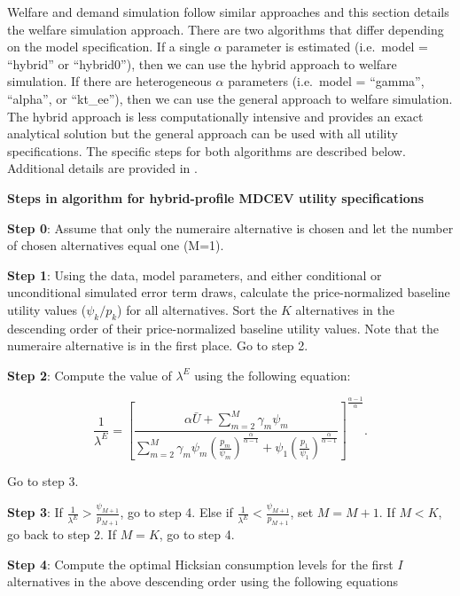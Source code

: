 Welfare and demand simulation follow similar approaches and this section
details the welfare simulation approach. There are two algorithms that
differ depending on the model specification. If a single \(\alpha\)
parameter is estimated (i.e.~model = ``hybrid'' or ``hybrid0''), then we
can use the hybrid approach to welfare simulation. If there are
heterogeneous \(\alpha\) parameters (i.e.~model = ``gamma'', ``alpha'',
or ``kt\_ee''), then we can use the general approach to welfare
simulation. The hybrid approach is less computationally intensive and
provides an exact analytical solution but the general approach can be
used with all utility specifications. The specific steps for both
algorithms are described below. Additional details are provided in
\citet{lloydsmithnew2018}.

\textbf{Steps in algorithm for hybrid-profile MDCEV utility
specifications}

\textbf{Step 0}: Assume that only the numeraire alternative is chosen
and let the number of chosen alternatives equal one (M=1).

\textbf{Step 1}: Using the data, model parameters, and either
conditional or unconditional simulated error term draws, calculate the
price-normalized baseline utility values (\(\psi_k/p_k\)) for all
alternatives. Sort the \(K\) alternatives in the descending order of
their price-normalized baseline utility values. Note that the numeraire
alternative is in the first place. Go to step 2.

\textbf{Step 2}: Compute the value of \(\lambda^E\) using the following
equation:

\begin{equation}
\frac{1}{\lambda^E} = \left[ \frac{\alpha \bar{U} + \sum_{m=2}^{M} \gamma_m \psi_m} {\sum_{m=2}^{M} \gamma_m \psi_m \left( \frac{p_m}{\psi_m} \right)^\frac{\alpha}{\alpha-1} + \psi_1 \left(\frac{p_1}{\psi_1} \right)^\frac{\alpha}{\alpha-1}} \right] ^\frac{\alpha-1}{\alpha}.
\end{equation}

Go to step 3.

\textbf{Step 3}: If
\(\frac{1}{\lambda^E} > \frac{\psi_{M+1}}{p_{M+1}}\), go to step 4. Else
if \(\frac{1}{\lambda^E} < \frac{\psi_{M+1}}{p_{M+1}}\), set
\(M = M + 1\). If \(M < K\), go back to step 2. If \(M = K\), go to step
4.

\textbf{Step 4}: Compute the optimal Hicksian consumption levels for the
first \(I\) alternatives in the above descending order using the
following equations

